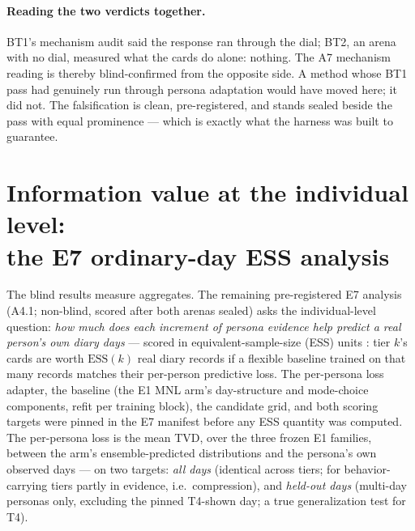 \documentclass[11pt]{article}
\begin{document}
\paragraph{Reading the two verdicts together.} BT1's mechanism audit
said the response ran through the dial; BT2, an arena with no dial,
measured what the cards do alone: nothing. The A7 mechanism reading is
thereby blind-confirmed from the opposite side. A method whose BT1 pass
had genuinely run through persona adaptation would have moved here; it
did not. The falsification is clean, pre-registered, and stands sealed
beside the pass with equal prominence --- which is exactly what the
harness was built to guarantee.

\section{Information value at the individual level:\\ the E7 ordinary-day ESS analysis}
\label{sec:ess}

The blind results measure aggregates. The remaining pre-registered E7
analysis (A4.1; non-blind, scored after both arenas sealed) asks the
individual-level question: \emph{how much does each increment of
persona evidence help predict a real person's own diary days} ---
scored in equivalent-sample-size (ESS) units \citep{gao2026ess}: tier
$k$'s cards are worth $\mathrm{ESS}(k)$ real diary records if a
flexible baseline trained on that many records matches their per-person
predictive loss. The per-persona loss adapter, the baseline (the E1 MNL
arm's day-structure and mode-choice components, refit per training
block), the candidate grid, and both scoring targets were pinned in the
E7 manifest before any ESS quantity was computed. The per-persona loss
is the mean TVD, over the three frozen E1 families, between the arm's
ensemble-predicted distributions and the persona's own observed days
--- on two targets: \emph{all days} (identical across tiers; for
behavior-carrying tiers partly in evidence, i.e.\ compression), and
\emph{held-out days} (multi-day personas only, excluding the pinned
T4-shown day; a true generalization test for T4).
\end{document}
